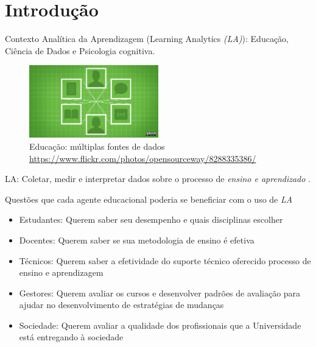 \section{Introdução}

\begin{frame}{Contexto}
    Analítica da Aprendizagem (Learning Analytics \textit{(LA)}): Educação, Ciência de Dados e Psicologia cognitiva.

    \begin{figure}[H]
        \centering
        \label{fig:digital_learning}
        \includegraphics[width=0.5\textwidth]{../../images/digital_learning.jpg}
        \\ \small Educação: múltiplas fontes de dados
        \\ \small \url{https://www.flickr.com/photos/opensourceway/8288335386/}
    \end{figure}

    LA: Coletar, medir e interpretar dados sobre o processo de \textit{ensino e aprendizado} \cite{lang2017handbook}.
\end{frame}

\begin{frame}{Questões que cada agente educacional poderia se beneficiar com o uso de \textit{LA}}
    \begin{itemize}[<alert@+>]\color{gray}
        \item Estudantes: Querem saber seu desempenho e quais disciplinas escolher
        \item Docentes: Querem saber se sua metodologia de ensino é efetiva
        \item Técnicos: Querem saber a efetividade do suporte técnico oferecido processo de ensino e aprendizagem
        \item Gestores: Querem avaliar os cursos e desenvolver padrões de avaliação para ajudar no desenvolvimento de estratégias de mudanças
        \item Sociedade: Querem avaliar a qualidade dos profissionais que a Universidade está entregando à sociedade
    \end{itemize}
\end{frame}

